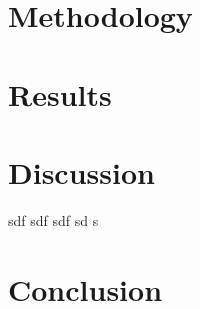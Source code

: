 \documentclass[12pt]{article}
\begin{document}
\newpage
\section{Methodology}

\newpage
\section{Results}

\newpage
\section{Discussion}

sdf \parencite{Coussy} sdf \parencite{BRUNO2020724} sdf \parencite{Numba2015} sd \parencite{diamond2016cvxpy} s \parencite{bib:Domahidi2013ecos}

\newpage
{}
{}
\section*{Conclusion}

\newpage
{}
{}
\renewcommand\refname{\centering Bibliography}
\printbibliography
\end{document}
